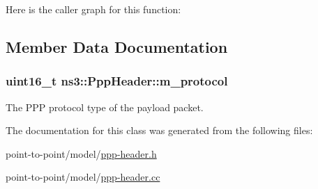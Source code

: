 Here is the caller graph for this function\+:




\subsection{Member Data Documentation}
\subsubsection[{\texorpdfstring{m\+\_\+protocol}{m_protocol}}]{\setlength{\rightskip}{0pt plus 5cm}uint16\+\_\+t ns3\+::\+Ppp\+Header\+::m\+\_\+protocol\hspace{0.3cm}{\ttfamily [private]}}\hypertarget{classns3_1_1PppHeader_a0d24ff8e3b289a1af3f0311a2f7f4deb}{}\label{classns3_1_1PppHeader_a0d24ff8e3b289a1af3f0311a2f7f4deb}


The P\+PP protocol type of the payload packet. 



The documentation for this class was generated from the following files\+:\begin{DoxyCompactItemize}
\item 
point-\/to-\/point/model/\hyperlink{ppp-header_8h}{ppp-\/header.\+h}\item 
point-\/to-\/point/model/\hyperlink{ppp-header_8cc}{ppp-\/header.\+cc}\end{DoxyCompactItemize}
